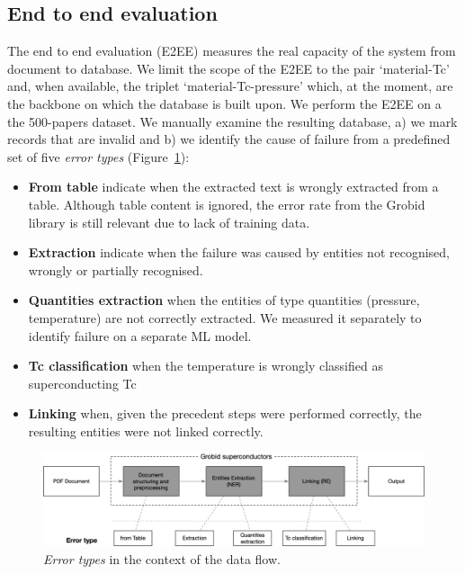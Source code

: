 \documentclass{article}
\begin{document}
\subsection{End to end evaluation}

The end to end evaluation (E2EE) measures the real capacity of the system from document to database.
We limit the scope of the E2EE to the pair `material-Tc' and, when available, the triplet `material-Tc-pressure' which, at the moment, are the backbone on which the database is built upon.
We perform the E2EE on a the 500-papers dataset. 
We manually examine the resulting database, a) we mark records that are invalid and b) we identify the cause of failure from a predefined set of five \textit{error types} (Figure~\ref{fig:error-types}):  
\begin{itemize}
    \item \textbf{From table} indicate when the extracted text is wrongly extracted from a table. Although table content is ignored, the error rate from the Grobid library is still relevant due to lack of training data. 
    \item \textbf{Extraction} indicate when the failure was caused by entities not recognised, wrongly or partially recognised.
    \item \textbf{Quantities extraction} when the entities of type quantities (pressure, temperature) are not correctly extracted. We measured it separately to identify failure on a separate ML model.  
    \item \textbf{Tc classification} when the temperature is wrongly classified as superconducting Tc
    \item \textbf{Linking} when, given the precedent steps were performed correctly, the resulting entities were not linked correctly. 
\end{itemize}

\begin{figure}[ht]
\centering
\includegraphics[width=\textwidth]{error-types-3.png}
\caption{\textit{Error types} in the context of the data flow. }
\label{fig:error-types}
\end{figure}
\end{document}
